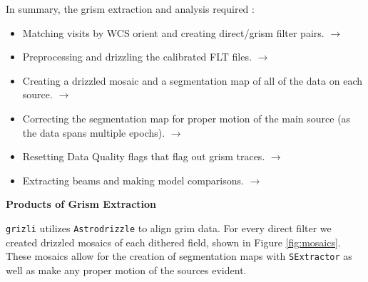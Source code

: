 \documentclass[12pt]{article}
\begin{document}
{{In summary, the grism extraction and analysis required : 
\begin{itemize}
\item Matching visits by WCS orient and creating direct/grism filter pairs.
    \href{http://grizli-calibration.readthedocs.io/en/latest/visit_matching.html#visit-matching-tools}{
        \color{blue}$\rightarrow$}
\item Preprocessing and drizzling the calibrated FLT files. 
    \href{http://grizli-calibration.readthedocs.io/en/latest/visit_matching.html#actually-matching-and-preprocessing-visits}{
        \color{blue}$\rightarrow$}
\item Creating a drizzled mosaic and a segmentation map of all of the data on each source.
    \href{http://grizli-calibration.readthedocs.io/en/latest/drizzling_extracting_etc.html}{
        \color{blue}$\rightarrow$ }
\item Correcting the segmentation map for proper motion of the main source (as the data spans multiple epochs).
    \href{http://grizli-calibration.readthedocs.io/en/latest/drizzling_extracting_etc.html#correcting-seg-map-for-proper-motion}{
        \color{blue}$\rightarrow$ }
\item Resetting Data Quality flags that flag out grism traces.
    \href{http://grizli-calibration.readthedocs.io/en/latest/objects_models_outputs.html#stopping-the-runaway-dq-flag-train}{
        \color{blue}$\rightarrow$ }
\item Extracting beams and making model comparisons. 
    \href{http://grizli-calibration.readthedocs.io/en/latest/objects_models_outputs.html#beams-and-initial-testing}{
        \color{blue}$\rightarrow$ }
\end{itemize}

{\bf Products of Grism Extraction} 

\texttt{grizli} utilizes \texttt{Astrodrizzle} to align grim data. For every direct filter we created drizzled mosaics
of each dithered field, shown in Figure \ref{fig:mosaics}. These mosaics allow for the creation of segmentation maps
with \texttt{SExtractor} as well as make any proper motion of the sources evident. 


}}
\end{document}
